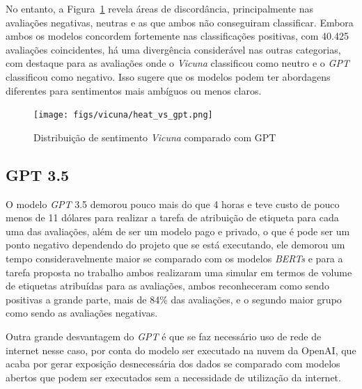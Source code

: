 No entanto, a Figura~\ref{img:heat_vicuna_vs_gpt} revela áreas de discordância, principalmente nas avaliações negativas, neutras e as que ambos não conseguiram classificar. Embora ambos os modelos concordem fortemente nas classificações positivas, com 40.425 avaliações coincidentes, há uma divergência considerável nas outras categorias, com destaque para as avaliações onde o \textit{Vicuna} classificou como neutro e o \textit{GPT} classificou como negativo. Isso sugere que os modelos podem ter abordagens diferentes para sentimentos mais ambíguos ou menos claros.

\begin{figure}
	\centering
	\texttt{[image: figs/vicuna/heat\_vs\_gpt.png]}
	\caption{Distribuição de sentimento \textit{Vicuna} comparado com GPT}
	\label{img:heat_vicuna_vs_gpt}
\end{figure}


\subsection{GPT 3.5}
\label{sec:resultados:subsec:gpt}


O modelo \textit{GPT} 3.5 demorou pouco mais do que 4 horas e teve custo de pouco menos de 11 dólares para realizar a tarefa de atribuição de etiqueta para cada uma das avaliações, além de ser um modelo pago e privado, o que é pode ser um ponto negativo dependendo do projeto que se está executando, ele demorou um tempo consideravelmente maior se comparado com os modelos \textit{BERTs} e para a tarefa proposta no trabalho ambos realizaram uma simular em termos de volume de etiquetas atribuídas para as avaliações, ambos reconheceram como sendo positivas a grande parte, mais de 84\% das avaliações, e o segundo maior grupo como sendo as avaliações negativas.

Outra grande desvantagem do \textit{GPT} é que se faz necessário uso de rede de internet nesse caso, por conta do modelo ser executado na nuvem da OpenAI, que acaba por gerar exposição desnecessária dos dados se comparado com modelos abertos que podem ser executados sem a necessidade de utilização da internet.

